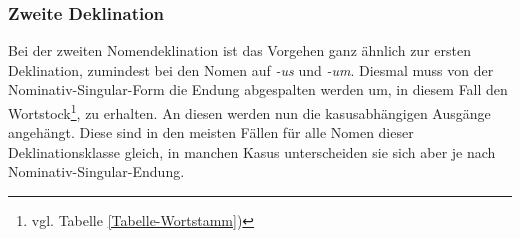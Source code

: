 \subsubsection{Zweite Deklination}
Bei der zweiten Nomendeklination ist das Vorgehen ganz ähnlich zur ersten Deklination, zumindest bei den Nomen auf \textit{-us} und \textit{-um}. Diesmal muss von der Nominativ-Singular-Form die Endung abgespalten werden um, in diesem Fall den Wortstock\footnote{vgl. Tabelle \ref{Tabelle-Wortstamm})}, zu erhalten. An diesen werden nun die kasusabhängigen Ausgänge angehängt. Diese sind in den meisten Fällen für alle Nomen dieser Deklinationsklasse gleich, in manchen Kasus unterscheiden sie sich aber je nach Nominativ-Singular-Endung. \par
